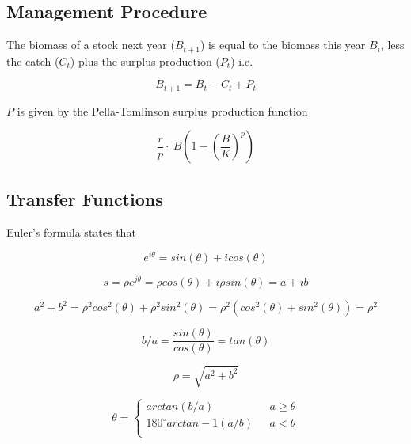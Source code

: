 \documentclass[%
nonumbib,      %
%
]{nrc1}                          %
\begin{document}
\subsection*{Management Procedure}

The biomass of a stock next year ($B_{t+1}$) is equal to the biomass this year $B_{t}$, less the catch ($C_t$) plus the surplus production ($P_t$) i.e. 

\begin{equation}  B_{t+1}=B_{t}-C_{t}+P_{t}\end{equation}  

$P$ is given by the Pella-Tomlinson surplus production function \citep{pella1969generalized}

\begin{equation}\frac{r}{p}\cdot~B(1-(\frac{B}{K})^p)\end{equation}  

\subsection{Transfer Functions}

Euler’s formula states that

\begin{equation} e^{i\theta}=sin(\theta) + icos(\theta) \end{equation}

\begin{equation}
s = \rho e^{j\theta} = \rho cos(\theta) + i\rho sin(\theta) = a + ib
\end{equation}

\begin{equation}
a^2 + b^2 = \rho^2 cos^2(\theta) + \rho^2 sin^2(\theta) = \rho^2 (cos^2(\theta) + sin^2(\theta)) = \rho^2
\end{equation}
       
\begin{equation}
b/a = \frac{sin(\theta)}{cos(\theta)} = tan(\theta)
\end{equation}

\begin{equation}
\rho=\sqrt{a^2+b^2}
\end{equation}


\begin{equation}
\theta = \left\{ \begin{array}{ll}
			arctan(b/a)     	&\mbox{ $a \geq \theta$} \\
			180^\circ arctan-1(a/b) &\mbox{ $a <    \theta$} \\
		\end{array}
       \right.
\end{equation}
\end{document}
